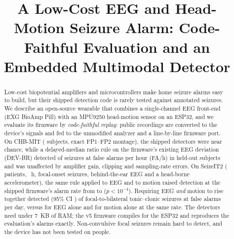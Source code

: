 \documentclass[conference,letterpaper]{IEEEtran}
\begin{document}
\title{A Low-Cost EEG and Head-Motion Seizure Alarm: Code-Faithful Evaluation and an Embedded Multimodal Detector}

\author{
\and
{}
}

\maketitle

\begin{abstract}
Low-cost biopotential amplifiers and microcontrollers make home seizure alarms easy to build, but their shipped detection code is rarely tested against annotated seizures. We describe an open-source wearable that combines a single-channel EEG front-end (EXG BioAmp Pill) with an MPU9250 head-motion sensor on an ESP32, and we evaluate its firmware by \emph{code-faithful replay}: public recordings are converted to the device's signals and fed to the unmodified analyzer and a line-by-line firmware port. On CHB-MIT (\NSubj{} subjects, exact FP1--FP2 montage), the shipped detectors were near chance, while a delayed-median ratio rule on the firmware's existing EEG deviation (DEV-BR) detected \DevASens{} of seizures at \DevAFAh{} false alarms per hour (FA/h) in held-out subjects and was unaffected by amplifier gain, clipping and sampling-rate errors. On SeizeIT2 (\SNSubj{} patients, \SHours{}~h, \SNSz{} focal-onset seizures, behind-the-ear EEG and a head-borne accelerometer), the same rule applied to EEG and to motion raised detection at the shipped firmware's alarm rate from \SFwSens{} to \SFusFwSens{} ($p{<}10^{-4}$). Requiring EEG \emph{and} motion to rise together detected \SCvASens{} (95\% CI \SCvACI{}) of focal-to-bilateral tonic--clonic seizures at \SCvAFAday{} false alarms per day, versus \SCvEegSens{} for EEG alone and \SCvMovSens{} for motion alone at the same rate. The detectors need under 7~KB of RAM; the v5 firmware compiles for the ESP32 and reproduces the evaluation's alarms exactly. Non-convulsive focal seizures remain hard to detect, and the device has not been tested on people.
\end{abstract}
\end{document}
